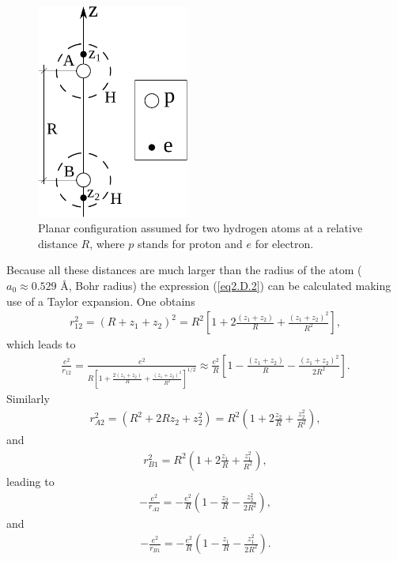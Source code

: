 \begin{subappendices}
    \begin{figure}
     \centerline{\includegraphics*[width=5cm,angle=0]{nutshell/figs/fig2D4_v2.pdf}}
     \caption{Planar configuration assumed for two hydrogen atoms at a relative distance $R$, where $p$ stands for proton and $e$ for electron.}\label{fig2.D.4}
     \end{figure}
Because all these distances are much larger than the radius of the atom ($a_0\approx0.529$ \AA, Bohr radius) the expression (\ref{eq2.D.2}) can be calculated making use of a Taylor expansion. One obtains
\begin{align}\label{eq2.D.4}
r_{12}^2=(R+z_1+z_2)^2=R^2\left[1+2\frac{(z_1+z_2)}{R}+\frac{(z_1+z_2)^2}{R^2}\right],
\end{align}
which leads to 
\begin{align}\label{eq2.D.5}
\frac{e^2}{r_{12}}=\frac{e^2}{R\left[1+\frac{2(z_1+z_2)}{R}+\frac{(z_1+z_2)^2}{R^2}\right]^{1/2}}\approx\frac{e^2}{R}\left[1-\frac{(z_1+z_2)}{R}-\frac{(z_1+z_2)^2}{2R^2}\right].
\end{align}
 Similarly
\begin{align}\label{eq2.D.6}
r^2_{A2}=\left(R^2+2Rz_2+z_2^2\right)=R^2\left(1+2\frac{z_2}{R}+\frac{z_2^2}{R^2}\right),
\end{align}
and
\begin{align}\label{eq2.D.7}
r^2_{B1}=R^2\left(1+2\frac{z_1}{R}+\frac{z_1^2}{R^2}\right),
\end{align}
leading to
\begin{align}\label{eq2.D.8}
-\frac{e^2}{r_{A2}}=-\frac{e^2}{R}\left(1-\frac{z_2}{R}-\frac{z_2^2}{2R^2}\right),
\end{align}
and
\begin{align}\label{eq2.D.9}
-\frac{e^2}{r_{B1}}=-\frac{e^2}{R}\left(1-\frac{z_1}{R}-\frac{z_1^2}{2R^2}\right).
\end{align}

\end{subappendices}
